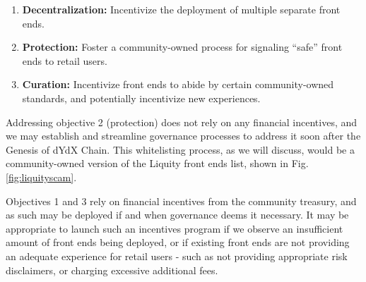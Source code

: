     \begin{enumerate}
        \item \textbf{Decentralization:} Incentivize the deployment of multiple separate front ends.
        \item \textbf{Protection:} Foster a community-owned process for signaling ``safe'' front ends to retail users.
        \item \textbf{Curation:} Incentivize front ends to abide by certain community-owned standards, and potentially incentivize new experiences.
    \end{enumerate}
    
    Addressing objective 2 (protection) does not rely on any financial incentives, and we may establish and streamline governance processes to address it soon after the Genesis of dYdX Chain. This whitelisting process, as we will discuss, would be a community-owned version of the Liquity front ends list, shown in Fig. \ref{fig:liquityscam}.
    
    Objectives 1 and 3 rely on financial incentives from the community treasury, and as such may be deployed if and when governance deems it necessary. It may be appropriate to launch such an incentives program if we observe an insufficient amount of front ends being deployed, or if existing front ends are not providing an adequate experience for retail users - such as not providing appropriate risk disclaimers, or charging excessive additional fees.

